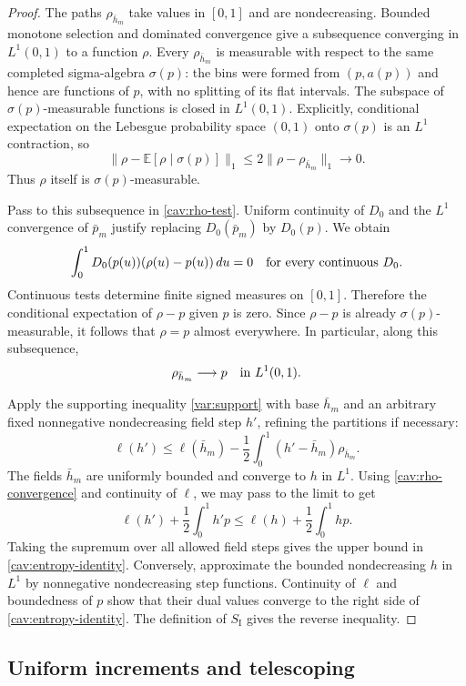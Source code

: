\begin{proof}
The paths $\rho_{\bar h_m}$ take values in $[0,1]$ and are
nondecreasing.  Bounded monotone selection and dominated convergence
give a subsequence converging in $L^1(0,1)$ to a function $\rho$.
Every $\rho_{\bar h_m}$ is measurable with respect to the same
completed sigma-algebra $\sigma(p)$: the bins were formed from
$(p,a(p))$ and hence are functions of $p$, with no splitting of its
flat intervals.  The subspace of $\sigma(p)$-measurable functions is
closed in $L^1(0,1)$.  Explicitly, conditional expectation on the Lebesgue probability space
$(0,1)$ onto $\sigma(p)$ is an $L^1$ contraction, so
\[
 \|\rho-\mathbb E[\rho\mid\sigma(p)]\|_1
 \le2\|\rho-\rho_{\bar h_m}\|_1\longrightarrow0.
\]
Thus $\rho$ itself is $\sigma(p)$-measurable.

Pass to this subsequence in \eqref{cav:rho-test}.  Uniform continuity of
$D_0$ and the $L^1$ convergence of $\bar p_m$ justify replacing
$D_0(\bar p_m)$ by $D_0(p)$.  We obtain
\[
 \int_0^1D_0(p(u))(\rho(u)-p(u))\,du=0
 \quad\hbox{for every continuous }D_0.
\]
Continuous tests determine finite signed measures on $[0,1]$.
Therefore the conditional expectation of $\rho-p$ given $p$ is zero.
Since $\rho-p$ is already $\sigma(p)$-measurable, it follows that
$\rho=p$ almost everywhere.  In particular, along this subsequence,
\begin{equation}\label{cav:rho-convergence}
 \rho_{\bar h_m}\longrightarrow p\quad\hbox{in }L^1(0,1).
\end{equation}

Apply the supporting inequality \eqref{var:support} with base
$\bar h_m$ and an arbitrary fixed nonnegative nondecreasing field step
$h'$, refining the partitions if necessary:
\[
 \ell(h')\le\ell(\bar h_m)
       -\frac12\int_0^1(h'-\bar h_m)\rho_{\bar h_m}.
\]
The fields $\bar h_m$ are uniformly bounded and converge to $h$ in
$L^1$.  Using \eqref{cav:rho-convergence} and continuity of $\ell$, we
may pass to the limit to get
\[
 \ell(h')+\frac12\int_0^1h'p
 \le\ell(h)+\frac12\int_0^1hp.
\]
Taking the supremum over all allowed field steps gives the upper bound
in \eqref{cav:entropy-identity}.  Conversely, approximate the bounded
nondecreasing $h$ in $L^1$ by nonnegative nondecreasing step functions.
Continuity of $\ell$ and boundedness of $p$ show that their dual values
converge to the right side of \eqref{cav:entropy-identity}.  The
definition of $S_{\mathrm I}$ gives the reverse inequality.
\end{proof}

\subsection{Uniform increments and telescoping}

